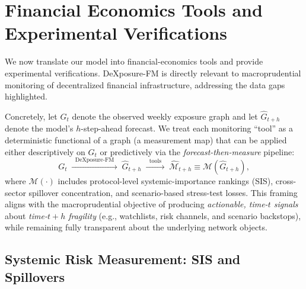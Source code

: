 \section{Financial Economics Tools and Experimental Verifications}
\label{sec:econ}

We now translate our model into financial-economics tools and provide experimental verifications. %
DeXposure-FM is directly relevant to macroprudential monitoring of decentralized financial infrastructure, addressing the data gaps highlighted.

Concretely, let $G_t$ denote the observed weekly exposure graph and let $\hat{G}_{t+h}$ denote the model's $h$-step-ahead forecast. We treat each monitoring ``tool'' as a deterministic functional of a graph (a measurement map) that can be applied either {descriptively} on $G_t$ or {predictively} via the \emph{forecast-then-measure} pipeline:
\begin{equation}
G_t \;\xrightarrow{\;\;\text{DeXposure-FM}\;\;}\; \hat{G}_{t+h}
\;\xrightarrow{\;\;\text{tools}\;\;}\;
\widehat{\mathcal{M}}_{t+h} \equiv \mathcal{M}(\hat{G}_{t+h}),
\end{equation}
where $\mathcal{M}(\cdot)$ includes protocol-level systemic-importance rankings (SIS), cross-sector spillover concentration, and scenario-based stress-test losses. This framing aligns with the macroprudential objective of producing \emph{actionable, time-$t$ signals} about \emph{time-$t+h$ fragility} (e.g., watchlists, risk channels, and scenario backstops), while remaining fully transparent about the underlying network objects.

\subsection{Systemic Risk Measurement: SIS and Spillovers}
\label{subsubsec:systemic-risk}


